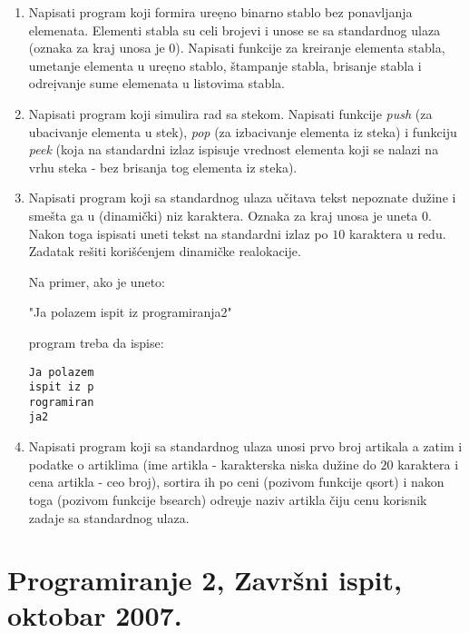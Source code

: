\begin{enumerate}
\item Napisati program koji formira ure\d eno binarno stablo bez
ponavljanja elemenata. Elementi stabla su celi brojevi i unose se sa
standardnog ulaza (oznaka za kraj unosa je 0). Napisati funkcije za
kreiranje elementa stabla, umetanje elementa u ure\d eno stablo,
\v stampanje stabla, brisanje stabla i odre\d ivanje sume elemenata u
listovima stabla.

\item Napisati program koji simulira rad sa stekom. Napisati funkcije
\emph{push} (za ubacivanje elementa u stek), \emph{pop} (za izbacivanje
elementa iz steka) i funkciju \emph{peek} (koja na standardni izlaz
ispisuje vrednost elementa koji se nalazi na vrhu steka - bez brisanja tog
elementa iz steka).

\item Napisati program koji sa standardnog ulaza u\v citava tekst nepoznate
du\v zine i sme\v sta ga u (dinami\v cki) niz karaktera. Oznaka za kraj
unosa je uneta 0.
Nakon toga ispisati uneti tekst na standardni izlaz po $10$ karaktera u
redu.
Zadatak re\v siti kori\v s\' cenjem dinami\v cke realokacije.

Na primer, ako je uneto:

"Ja polazem ispit iz programiranja2"

program treba da ispise:

\begin{verbatim}
Ja polazem
ispit iz p
rogramiran
ja2
\end{verbatim}

\item Napisati program koji sa standardnog ulaza unosi prvo broj artikala
a zatim i podatke o artiklima
(ime artikla - karakterska niska du\v zine do $20$ karaktera i cena artikla
 - ceo broj), sortira ih po ceni (pozivom funkcije qsort) i
nakon toga (pozivom funkcije bsearch) odre\d uje naziv artikla
\v ciju cenu korisnik zadaje sa standardnog ulaza.
\end{enumerate}


\section{Programiranje 2, Zavr\v{s}ni ispit, oktobar 2007.}



